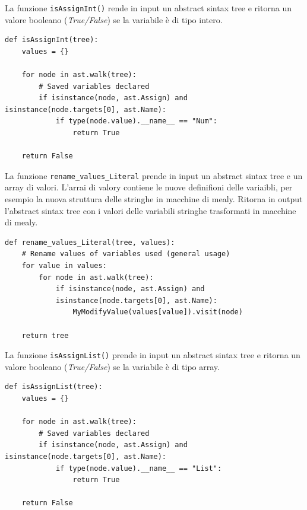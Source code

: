 \documentclass[a4paper,oneside,openright,titlepage,10pt,footinclude,headinclude]{scrbook}
\begin{document}
La funzione \texttt{isAssignInt()} rende in input un abstract sintax tree e ritorna un valore booleano (\textit{True/False}) se la variabile è di tipo intero.
\begin{graybox}[innerleftmargin=2,]
\begin{lstlisting}
def isAssignInt(tree):
    values = {}

    for node in ast.walk(tree):
        # Saved variables declared
        if isinstance(node, ast.Assign) and isinstance(node.targets[0], ast.Name):
            if type(node.value).__name__ == "Num":
                return True

    return False
\end{lstlisting}
\end{graybox}


La funzione \texttt{rename\_values\_Literal} prende in input un abstract sintax tree e un array di valori. L'arrai di valory contiene le nuove definifioni delle variaibli, per esempio la nuova struttura delle stringhe in macchine di mealy. Ritorna in output l'abstract sintax tree con i valori delle variabili stringhe trasformati in macchine di mealy.
\begin{graybox}[innerleftmargin=2,]
\begin{lstlisting}
def rename_values_Literal(tree, values):
    # Rename values of variables used (general usage)
    for value in values:
        for node in ast.walk(tree):
            if isinstance(node, ast.Assign) and 
            isinstance(node.targets[0], ast.Name):
                MyModifyValue(values[value]).visit(node)

    return tree
\end{lstlisting}
\end{graybox}

La funzione \texttt{isAssignList()} prende in input un abstract sintax tree e ritorna un valore booleano (\textit{True/False}) se la variabile è di tipo array.
\begin{graybox}[innerleftmargin=2,]
\begin{lstlisting}
def isAssignList(tree):
    values = {}

    for node in ast.walk(tree):
        # Saved variables declared
        if isinstance(node, ast.Assign) and isinstance(node.targets[0], ast.Name):
            if type(node.value).__name__ == "List":
                return True

    return False
\end{lstlisting}
\end{graybox}
\end{document}
